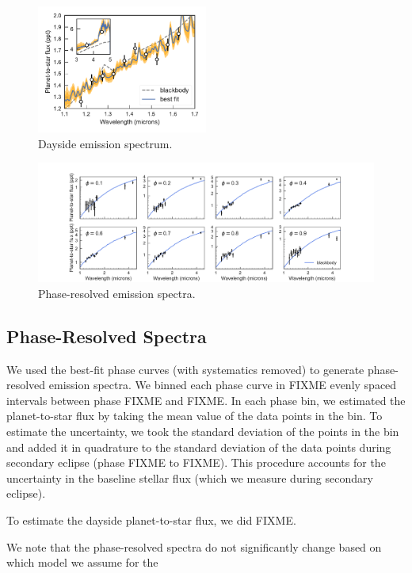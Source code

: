 \documentclass[twocolumn]{aastex61}
\begin{document}
\begin{figure}
\includegraphics[width = 0.5\textwidth]{Figures/dayside_spectrum.pdf}
\caption{Dayside emission spectrum.}
\label{fig:dayside}
\end{figure}

\begin{figure}
\includegraphics[width = 1.0\textwidth]{Figures/emission_spectra.pdf}
\caption{Phase-resolved emission spectra.}
\label{fig:spectra}
\end{figure}

\subsection{Phase-Resolved Spectra}
We used the best-fit phase curves (with systematics removed) to generate phase-resolved emission spectra. We binned each phase curve in FIXME evenly spaced intervals between phase FIXME and FIXME. In each phase bin, we estimated the planet-to-star flux by taking the mean value of the data points in the bin. To estimate the uncertainty, we took the standard deviation of the points in the bin and added it in quadrature to the standard deviation of the data points during secondary eclipse (phase FIXME to FIXME). This procedure accounts for the uncertainty in the baseline stellar flux (which we measure during secondary eclipse).

To estimate the dayside planet-to-star flux, we did FIXME.

We note that the phase-resolved spectra do not significantly change based on which model we assume for the  
\end{document}
